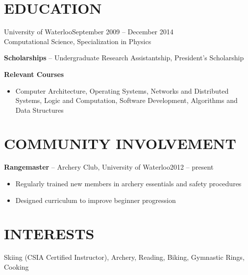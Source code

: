 \documentclass{res}
\begin{document}
\begin{resume}
\section{EDUCATION}
  \vspace{3mm}
    University of Waterloo\hfill September 2009 -- December 2014\\
    Computational Science, Specialization in Physics
    \vspace{-3mm}
 
    {\bf Scholarships} -- Undergraduate Research Assistantship, President's Scholarship
    \vspace{-3mm}
 
    {\bf Relevant Courses}
      \vspace{1mm}
      \begin{itemize}
       \item Computer Architecture, Operating Systems, Networks and Distributed Systems, Logic and Computation, Software Development, Algorithms and Data Structures
      \end{itemize}
 
 
\section{COMMUNITY INVOLVEMENT}
    \vspace{3mm}
    {\bf Rangemaster} -- Archery Club, University of Waterloo\hfill 2012 -- present\\
    \vspace{-2mm}
   \begin{itemize}
    \item Regularly trained new members in archery essentials and safety procedures
    \item Designed curriculum to improve beginner progression
   \end{itemize}

\section{INTERESTS}
  \vspace{3mm}
  Skiing (CSIA Certified Instructor), Archery, Reading, Biking, Gymnastic Rings, Cooking


\end{resume}
\end{document}
